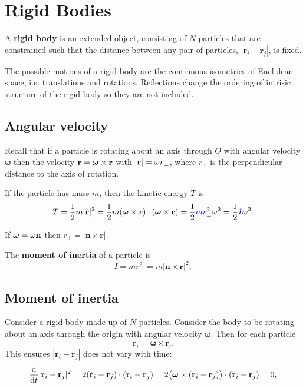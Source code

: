 \section{Rigid Bodies}

\begin{definition}
    A \textbf{rigid body} is an extended object, consisting of $N$ particles that are constrained such that the distance between any pair of particles, $|\mathbf{r}_i - \mathbf{r}_j|$, is fixed. 
\end{definition}

The possible motions of a rigid body are the continuous isometries of Euclidean space, i.e. translations and rotations. Reflections change the ordering of intrisic structure of the rigid body so they are not included.

\subsection{Angular velocity}

Recall that if a particle is rotating about an axis through $O$ with angular velocity $ \boldsymbol{\omega} $ then the velocity $ \dot{{\bf r}} = \boldsymbol{\omega}\times {\bf r} $ with $ |\dot{{\bf r}}|=\omega r_\perp  $, where $ r_\perp  $ is the perpendicular distance to the axis of rotation.

If the particle has mass $m$, then the kinetic energy $T$ is 
\[
    T = \frac{1}{2}m|\dot{\mathbf{r}}|^2 = \frac{1}{2}m (\boldsymbol{\omega}\times {\bf r})\cdot (\boldsymbol{\omega}\times {\bf r}) = \frac{1}{2}{\color{blue}mr_\perp^2} \omega^2 = \frac{1}{2}{\color{blue}I} \omega^2 .
\]
\begin{note}
    If $ \boldsymbol{\omega}=\omega {\bf n} $ then $ r_\perp = |\mathbf{n}\times \mathbf{r}| $.
\end{note}

\begin{definition}
    The \textbf{moment of inertia} of a particle is
    \[
      I = m r_\perp^2 = m|\mathbf{n}\times \mathbf{r}|^2,
    \]
\end{definition}

\subsection{Moment of inertia}

Consider a rigid body made up of $N$ particles. Consider the body to be rotating about an axis through the origin with angular velocity $ \boldsymbol{\omega} $. Then for each particle 
\[
    \dot{\mathbf{r}}_i = \boldsymbol\omega\times \mathbf{r}_i.
\]
This ensures $ |\mathbf{r}_i-\mathbf{r}_j| $ does not vary with time:
\[
  \frac{\mathrm{d} }{\mathrm{d} t}|\mathbf{r}_i - \mathbf{r}_j|^2 = 2(\dot{\mathbf{r}}_i - \dot{\mathbf{r}}_j)\cdot (\mathbf{r}_i - \mathbf{r}_j) = 2\big(\boldsymbol\omega\times (\mathbf{r}_i - \mathbf{r}_j)\big) \cdot (\mathbf{r}_i - \mathbf{r}_j) = 0,
\]

